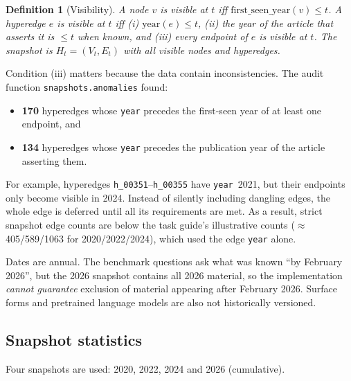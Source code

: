 \documentclass[11pt,a4paper]{article}
\newtheorem{definition}{Definition}[section]
\theoremstyle{remark}
\newcommand{\code}[1]{\texttt{\small #1}}
\begin{document}
\begin{definition}[Visibility]
A node $v$ is visible at $t$ iff $\mathrm{first\_seen\_year}(v)\le t$. A hyperedge
$e$ is visible at $t$ iff (i) $\mathrm{year}(e)\le t$, (ii) the year of the article
that asserts it is $\le t$ when known, and (iii) every endpoint of $e$ is visible at
$t$. The snapshot is $H_t=(V_t,E_t)$ with all visible nodes and hyperedges.
\end{definition}

Condition (iii) matters because the data contain inconsistencies. The audit function
\code{snapshots.anomalies} found:
\begin{itemize}
  \item \textbf{170} hyperedges whose \code{year} precedes the first-seen year of at
        least one endpoint, and
  \item \textbf{134} hyperedges whose \code{year} precedes the publication year of the
        article asserting them.
\end{itemize}
For example, hyperedges \code{h\_00351}--\code{h\_00355} have \code{year}~2021, but
their endpoints only become visible in 2024. Instead of silently including dangling
edges, the whole edge is deferred until all its requirements are met. As a result,
strict snapshot edge counts are below the task guide's illustrative counts
($\approx$405/589/1063 for 2020/2022/2024), which used the edge \code{year} alone.

\begin{cautionbox}
Dates are annual. The benchmark questions ask what was known ``by February 2026'', but
the 2026 snapshot contains all 2026 material, so the implementation \emph{cannot
guarantee} exclusion of material appearing after February 2026. Surface forms and
pretrained language models are also not historically versioned.
\end{cautionbox}

\subsection{Snapshot statistics}

Four snapshots are used: 2020, 2022, 2024 and 2026 (cumulative).
\end{document}

